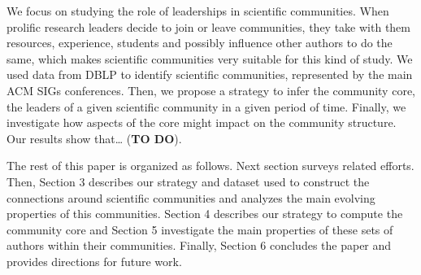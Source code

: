 We focus on studying the role of leaderships in scientific communities. When prolific research leaders decide to join or leave communities, they take with them resources,
experience, students and possibly influence other authors to do the same, which makes scientific communities very suitable for this kind of study. We used data from DBLP to identify
scientific communities, represented by the main ACM SIGs conferences. Then, we propose a strategy to infer the community core, the leaders of a given scientific community in a
given period of time. Finally, we investigate how aspects of the core might impact on the community structure. Our results show that… (\textbf{TO DO}). 

The rest of this paper is organized as follows. Next section surveys related efforts. Then, Section 3 describes our strategy and dataset used to construct the connections around
scientific communities and analyzes the main evolving properties of this communities.  Section 4 describes our strategy to compute the community core and Section 5 investigate the
main properties of these sets of authors within their communities.  Finally, Section 6 concludes the paper and provides directions for future work. 




